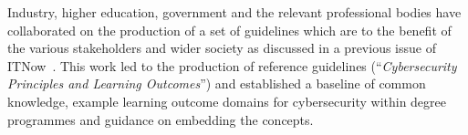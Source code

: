 \documentclass[a4paper,11pt]{article}
\begin{document}

Industry, higher education, government and the relevant professional bodies have collaborated on the production of a set of guidelines which are to the benefit of the various stakeholders and wider society as discussed in a previous issue of ITNow~\cite{Irons2016}. This work led to the production of reference guidelines (``{\emph{Cybersecurity Principles and Learning Outcomes}}'')  and established a baseline of common knowledge, example learning outcome domains for cybersecurity within  degree programmes and guidance on embedding the concepts. 
\end{document}

